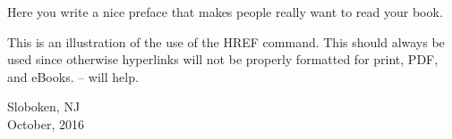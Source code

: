 Here you write a nice preface that makes people really want to read your book.

\lipsum[1-5]

This is an illustration of the use of the HREF command. This should always be used since otherwise hyperlinks will not be properly formatted for print, PDF, and eBooks. --  will help.

\hfill Sloboken, NJ\\
\aquarius \hfill October, 2016
